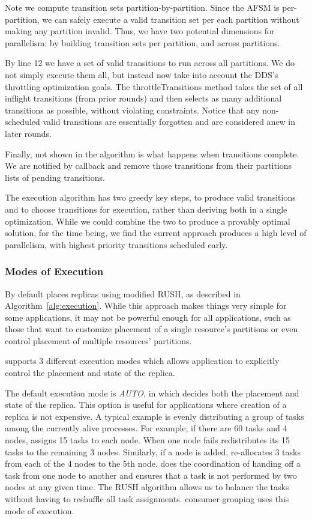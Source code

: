 Note we compute transition sets partition-by-partition.  Since the AFSM is
per-partition, we can safely execute a valid transition set per each partition
without making any partition invalid.  Thus, we have two potential dimensions for
parallelism: by building transition sets per partition, and across partitions.

By line 12 we have a set of valid transitions to run
across all partitions.  We do not simply execute them all, but instead now take
into account the DDS's throttling optimization goals.  The throttleTransitions
method takes the set of all inflight transitions (from prior rounds) and then
selects as many additional transitions as possible, without violating
constraints.  Notice that any non-scheduled valid transitions are essentially
forgotten and are considered anew in later rounds.

Finally, not shown in the algorithm is what happens when transitions complete.
We are notified by callback and remove those transitions from their partitions
lists of pending transitions.

The execution algorithm has two greedy key steps, to produce valid transitions and to
choose transitions for execution, rather than deriving both in a single
optimization.
While we could combine the two to produce a provably optimal solution, for the
time being, we find the current approach produces a high level of parallelism,
with highest priority transitions scheduled early.

\subsubsection{\helix Modes of Execution}
\label{sec:placement}
%
By default \helix places replicas using modified RUSH, as described in
Algorithm~\ref{alg:execution}.  
While this approach makes things very simple for some applications, it may not
be powerful enough for all applications, such as those that want to customize
placement of a single resource's partitions or even control placement of
multiple resources' partitions. 

\helix supports 3 different execution modes which allows application to explicitly control the placement and state of the replica.

The default execution mode is \emph{AUTO}, in which \helix decides both the placement and state of the replica. This option is useful 
for applications where creation of a replica is not expensive. A typical example is evenly distributing a group of tasks 
among the currently alive processes. For example, if there are 60 tasks and 4
nodes, \helix assigns 15 tasks to each node.  When one node fails \helix
redistributes its 15 tasks to the remaining 3 nodes. Similarly, if a node is added, \helix 
re-allocates 3 tasks from each of the 4 nodes to the 5th node. \helix does the coordination of 
handing off a task from one node to another and ensures that a task is not
performed by two nodes at any given time. The RUSH algorithm allows us to balance the tasks without having to 
 reshuffle all task assignments. \databus consumer grouping uses this mode of execution.

